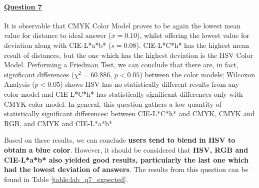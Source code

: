 \paragraph{\ul{Question 7}}
%
It is observable that CMYK Color Model proves to be again the lowest mean value for distance to ideal answer ($\overline{x} = 0.10$), whilst offering the lowest value for deviation along with CIE-L*a*b* ($s = 0.08$). CIE-L*C*h* has the
highest mean result of distances, but the one which has the highest deviation is the HSV Color Model.
Performing a Friedman Test, we can conclude that there are, in fact, significant differences ($\chi^2 = 60.886$, $p < 0.05$) between the color models; Wilcoxon Analysis ($p < 0.05$)
shows HSV has no statistically different results from any color model and CIE-L*C*h* has statistically significant differences only with CMYK color model. In general, this question
gathers a low quantity of statistically significant differences: between CIE-L*C*h* and CMYK, CMYK and RGB, and CMYK and CIE-L*a*b* \par
%
Based on these results, we can conclude \textbf{users tend to blend in HSV to obtain a blue color}. However, it should be considered that \textbf{HSV, RGB and CIE-L*a*b* also yielded good results, particularly the last one which had the
lowest deviation of answers}. The results from this question can be found in Table \ref{table:lab_q7_expected}.
%
